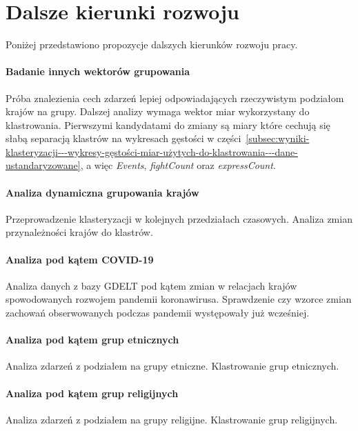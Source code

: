 \documentclass[11pt]{report}
\begin{document}
    \section{Dalsze kierunki rozwoju}\label{sec:dalsze-kierunki-rozwoju}
    Poniżej przedstawiono propozycje dalszych kierunków rozwoju pracy.

    \paragraph{Badanie innych wektorów grupowania}
    Próba znalezienia cech zdarzeń lepiej odpowiadających rzeczywistym podziałom krajów na grupy.
    Dalszej analizy wymaga wektor miar wykorzystany do klastrowania.
    Pierwszymi kandydatami do zmiany są miary które cechują się słabą separacją klastrów na wykresach gęstości w części~\ref{subsec:wyniki-klasteryzacji---wykresy-gęstości-miar-użytych-do-klastrowania---dane-ustandaryzowane}, a więc \textit{Events}, \textit{fightCount} oraz \textit{expressCount}.

    \paragraph{Analiza dynamiczna grupowania krajów}
    Przeprowadzenie klasteryzacji w kolejnych przedziałach czasowych.
    Analiza zmian przynależności krajów do klastrów.

    \paragraph{Analiza pod kątem COVID-19}
    Analiza danych z bazy GDELT pod kątem zmian w relacjach krajów spowodowanych rozwojem pandemii koronawirusa.
    Sprawdzenie czy wzorce zmian zachowań obserwowanych podczas pandemii występowały już wcześniej.

    \paragraph{Analiza pod kątem grup etnicznych}
    Analiza zdarzeń z podziałem na grupy etniczne.
    Klastrowanie grup etnicznych.

    \paragraph{Analiza pod kątem grup religijnych}
    Analiza zdarzeń z podziałem na grupy religijne.
    Klastrowanie grup religijnych.

    \appendix
    \newpage
\end{document}
